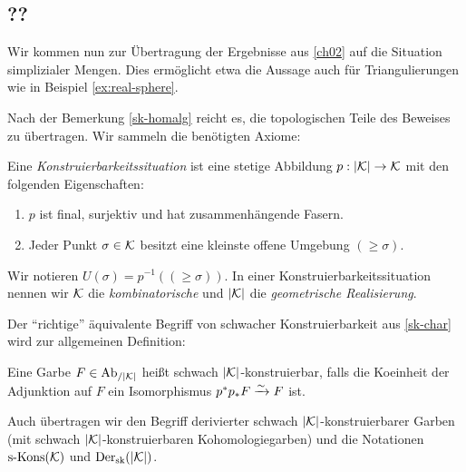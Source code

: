 \subsection{??}

Wir kommen nun zur Übertragung der Ergebnisse aus \ref{ch02} auf die
Situation simplizialer Mengen. Dies ermöglicht etwa die Aussage auch
für Triangulierungen wie in Beispiel \ref{ex:real-sphere}.

Nach der Bemerkung \ref{sk-homalg} reicht es, die topologischen Teile
des Beweises zu übertragen. Wir sammeln die benötigten Axiome:
\begin{defn} \label{def:constr}
  Eine \emph{Konstruierbarkeitssituation} ist eine stetige Abbildung
  $p: |\mathcal{K}| \to \mathcal{K}$ mit den folgenden Eigenschaften:
  \begin{enumerate}
  \item \label{itm:constr-final} $p$ ist final, surjektiv und hat
    zusammenhängende Fasern.
  \item \label{itm:constr-comb-space} Jeder Punkt $\sigma \in \mathcal{K}$
    besitzt eine kleinste offene Umgebung $(\geq \sigma)$.
  \end{enumerate}
\end{defn}
Wir notieren $U(\sigma) = p^{-1}((\geq \sigma))$. In einer
Konstruierbarkeitssituation nennen wir $\mathcal{K}$ die \emph{kombinatorische}
und $|\mathcal{K}|$ die \emph{geometrische Realisierung}.

Der ``richtige'' äquivalente Begriff von schwacher Konstruierbarkeit
aus \ref{sk-char} wird zur allgemeinen Definition:
\begin{defn}
  Eine Garbe $F \in \operatorname{Ab}_{/|\mathcal{K}|}$ heißt schwach $|\mathcal{K}|$-konstruierbar, falls
  die Koeinheit der Adjunktion auf $F$ ein Isomorphismus $p^* p_* F
  \xrightarrow[]{\sim} F$ ist.
\end{defn}
Auch übertragen wir den Begriff derivierter schwach
$|\mathcal{K}|$-konstruierbarer Garben (mit schwach $|\mathcal{K}|$-konstruierbaren
Kohomologiegarben) und die Notationen $\operatorname{s-Kons}(\mathcal{K})$ und $\operatorname{Der}_{\mathrm{sk}}(|\mathcal{K}|)$.

